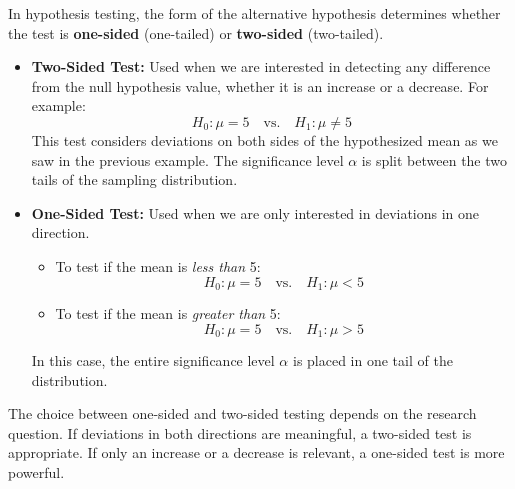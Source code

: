 \documentclass[twoside]{book}
\begin{document}
In hypothesis testing, the form of the alternative hypothesis determines whether the test is \textbf{one-sided} (one-tailed) or \textbf{two-sided} (two-tailed).

\begin{itemize}
    \item \textbf{Two-Sided Test:} Used when we are interested in detecting any difference from the null hypothesis value, whether it is an increase or a decrease. For example:
    \[
    H_0: \mu = 5 \quad \text{vs.} \quad H_1: \mu \ne 5
    \]
    This test considers deviations on both sides of the hypothesized mean as we saw in the previous example. The significance level $\alpha$ is split between the two tails of the sampling distribution.

    \item \textbf{One-Sided Test:} Used when we are only interested in deviations in one direction.
    \begin{itemize}
        \item To test if the mean is \emph{less than} 5:
        \[
        H_0: \mu = 5 \quad \text{vs.} \quad H_1: \mu < 5
        \]
        \item To test if the mean is \emph{greater than} 5:
        \[
        H_0: \mu = 5 \quad \text{vs.} \quad H_1: \mu > 5
        \]
    \end{itemize}
    In this case, the entire significance level $\alpha$ is placed in one tail of the distribution.
\end{itemize}

\noindent
The choice between one-sided and two-sided testing depends on the research question. If deviations in both directions are meaningful, a two-sided test is appropriate. If only an increase or a decrease is relevant, a one-sided test is more powerful.




\end{document}
